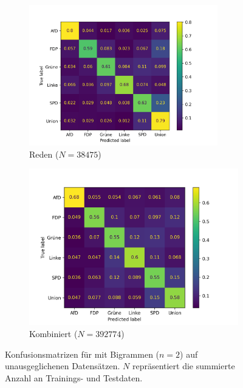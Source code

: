 \begin{figure}[H]
\begin{subfigure}{0.5\textwidth}
      \includegraphics[width=0.9\textwidth]{data/images/modeling/fasttext/none/speeches_confusion_matrix.png}
      \caption{Reden (\(N = \num{38475}\))} \label{sfig:confusionMatrixFastTextSpeechesUnbalanced}
    \end{subfigure}
    \hfill
    \begin{subfigure}{0.49\textwidth}
      \includegraphics[width=\textwidth]{data/images/modeling/fasttext/none/all_confusion_matrix.png}
      \caption{Kombiniert (\(N = \num{392774}\))} \label{sfig:confusionMatrixFastTextAllUnbalanced}
    \end{subfigure}
    \caption[Konfusionsmatrizen für \ft mit Bigrammen (\(n = \num{2}\)) auf unausgeglichenen Datensätzen]{Konfusionsmatrizen für \ft mit Bigrammen (\(n = \num{2}\)) auf unausgeglichenen Datensätzen. \(N\) repräsentiert die summierte Anzahl an Trainings- und Testdaten.} \label{fig:unbalancedConfusionMatrixFastText}
\end{figure}

